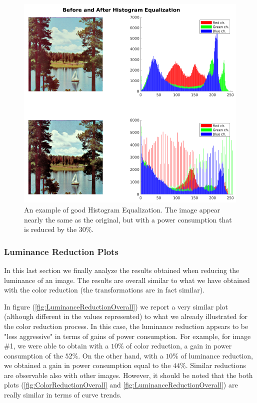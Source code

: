 \documentclass[a4paper]{article}
\begin{document}
            \begin{figure}[htp]
                \centering
                \includegraphics[width=0.6 \columnwidth]{./screenshots/hist_equalization_RGB_img_13}
                \caption{
                        \label{fig:hist_equalization_RGB_img_13}
                        An example of good Histogram Equalization. The image appear nearly the same as the original, but with a power consumption that is reduced by the $30\%$.
                }
            \end{figure}

        \subsubsection{Luminance Reduction Plots}
            In this last section we finally analyze the results obtained when reducing the luminance of an image. The results are overall similar to what we have obtained with the color reduction (the transformations are in fact similar).

            In figure (\ref{fig:LuminanceReductionOverall}) we report a very similar plot (although different in the values represented) to what we already illustrated for the color reduction process.
            In this case, the luminance reduction appears to be "less aggressive" in terms of gains of power consumption.
            For example, for image \#1, we were able to obtain with a $10\%$ of color reduction, a gain in power consumption of the $52\%$. On the other hand, with a $10\%$ of luminance reduction, we obtained a gain in power consumption equal to the $44\%$. Similar reductions are observable also with other images. However, it should be noted that the both plots (\ref{fig:ColorReductionOverall} and \ref{fig:LuminanceReductionOverall}) are really similar in terms of curve trends.
\end{document}
